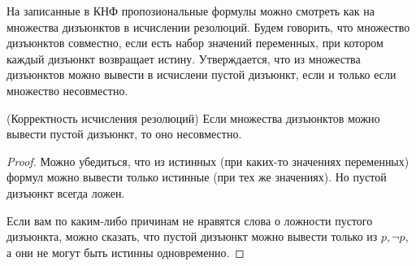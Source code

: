 \documentclass{article}
\begin{document}
На записанные в КНФ пропозиональные формулы можно смотреть как на множества дизъюнктов в исчислении резолюций. Будем говорить, что множество дизъюнктов совместно, если есть набор значений переменных, при котором каждый дизъюнкт возвращает истину. Утверждается, что из множества дизъюнктов можно вывести в исчислени пустой дизъюнкт, если и только если множество несовместно.

\begin{theorem}{(Корректность исчисления резолюций)}
	Если множества дизъюнктов можно вывести пустой дизъюнкт, то оно несовместно.
\end{theorem}
\begin{proof}
	Можно убедиться, что из истинных (при каких-то значениях переменных) формул можно вывести только истинные (при тех же значениях). Но пустой дизъюнкт всегда ложен.

	Если вам по каким-либо причинам не нравятся слова о ложности пустого дизъюнкта, можно сказать, что пустой дизъюнкт можно вывести только из $p, \lnot p$, а они не могут быть истинны одновременно.
\end{proof}
\end{document}
